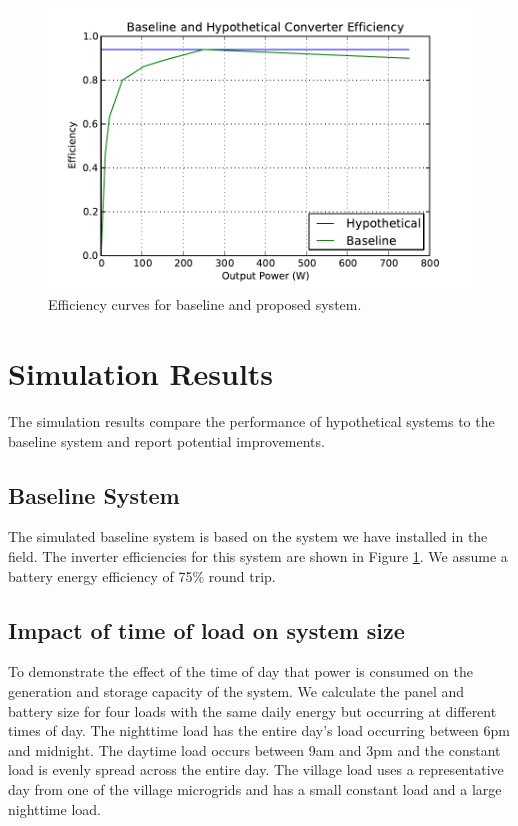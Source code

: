\documentclass[conference]{IEEEtran}
\begin{document}
\begin{figure}[]
\begin{center}
\includegraphics[width=\columnwidth]{figures/inverter_curves.pdf}
\end{center}
\caption{Efficiency curves for baseline and proposed system.}
\label{inverter_curves}
\end{figure}

\section{Simulation Results}

The simulation results compare the performance of hypothetical
systems to the baseline system and report potential improvements.

\subsection{Baseline System}
The simulated baseline system is based on the system we have
installed in the field.
The inverter efficiencies for this system are shown in Figure
\ref{inverter_curves}.
We assume a battery energy efficiency of 75\% round trip.

\subsection{Impact of time of load on system size}

To demonstrate the effect of the time of day that power
is consumed on the generation and storage capacity of the system.
We calculate the panel and battery size for four loads with
the same daily energy but occurring at different times of day.
The nighttime load has the entire day's load occurring between
6pm and midnight.
The daytime load occurs between 9am and 3pm and the constant
load is evenly spread across the entire day.
The village load uses a representative day from one of the
village microgrids and has a small constant load and a large
nighttime load.
\end{document}
